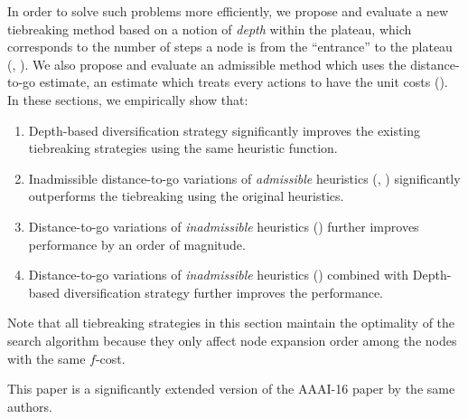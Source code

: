 In order to solve such problems more efficiently, we propose and
evaluate a new
tiebreaking method based on a notion of \emph{depth} within the plateau,
which corresponds to the number of steps a node is from the ``entrance'' to
the plateau (,
). We also propose and evaluate an
admissible method which uses the distance-to-go estimate, an estimate which treats every actions
to have the unit costs ().
In these sections, we empirically show that:
\begin{enumerate}
 \item Depth-based diversification strategy significantly improves the
       existing tiebreaking strategies using the same heuristic function.
 \item Inadmissible distance-to-go variations of \emph{admissible} heuristics
       (\lmcut, \mands)
       significantly outperforms the tiebreaking using the original heuristics.
 \item Distance-to-go variations of \emph{inadmissible} heuristics
       (\ff) further improves performance by an order of magnitude.
 \item Distance-to-go variations of \emph{inadmissible} heuristics
       (\ff) combined with Depth-based diversification strategy further
       improves the performance.
\end{enumerate}

Note that all tiebreaking strategies in this section maintain the
optimality of the search algorithm because they only affect node
expansion order among the nodes with the same $f$-cost.




This paper is a significantly extended version of the AAAI-16 paper by
the same authors. 
